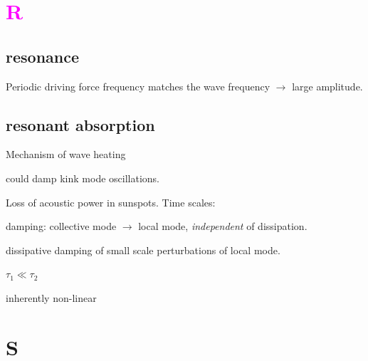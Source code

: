 \documentclass[12pt]{article}
\begin{document}
\section*{\textcolor{magenta}{R}}

\subsection*{resonance}
Periodic driving force frequency matches the wave frequency
$\rightarrow$ large amplitude.

\subsection*{resonant absorption}
\begin{itemize*}
    \item Mechanism of wave heating
    \item could damp kink mode oscillations.
    \item Loss of acoustic power in sunspots. Time scales:
        \begin{enumerate*}
            \item damping: collective mode $\rightarrow$ local mode,
                \emph{independent} of dissipation.
            \item dissipative damping of small scale perturbations of local
                mode.
        \end{enumerate*}
        $\tau_1 \ll \tau_2$
    \item inherently non-linear
\end{itemize*}

\section*{S}
\end{document}
